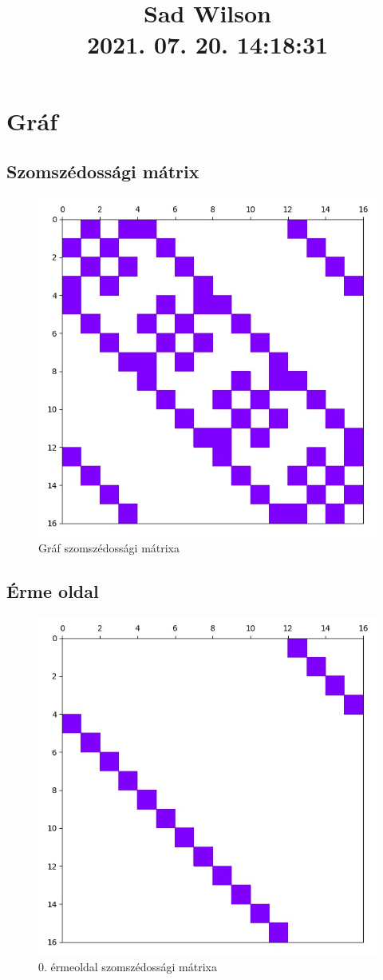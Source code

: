 \documentclass[14pt,a4paper]{article}
\title{Sad Wilson \\ \large 2021. 07. 20. 14:18:31}
\author{}
\date{}
\begin{document}
\maketitle
\section{Gráf}
\subsection{Szomszédossági mátrix}
\begin{figure}[H]
\centering
\includegraphics[width = 0.7\columnwidth]{graph/graph.jpg}
\caption{Gráf szomszédossági mátrixa}
\end{figure}
\subsection{Érme oldal}
\begin{figure}[H]
\centering
\includegraphics[width = 0.7\columnwidth]{coin_faces/coin_face_00.jpg}
\caption{0. érmeoldal szomszédossági mátrixa}
\end{figure}
\end{document}

